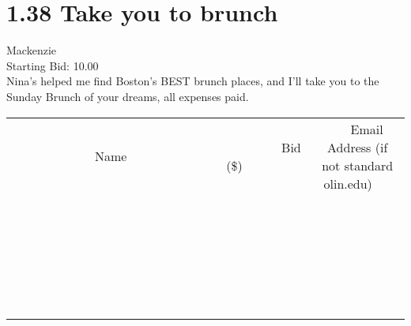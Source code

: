 \documentclass[11pt]{article}
\begin{document}
					\section*{1.38 Take you to brunch}
					Mackenzie \\
					Starting Bid: 10.00 \\
					Nina's helped me find Boston's BEST brunch places, and I'll take you to the Sunday Brunch of your dreams, all expenses paid. \\
					[6ex]
					\begin{tabular}{c c c}
						~~~~~~~~~~~~~Name~~~~~~~~~~~~~ & ~~~~~~~~~Bid (\$)~~~~~~~~~ & ~~~Email Address (if not standard olin.edu)~~~ \\
				
 & & \\
\hline
 & & \\
\hline
 & & \\
\hline
 & & \\
\hline
 & & \\
\hline
 & & \\
\hline
 & & \\
\hline
 & & \\
\hline
 & & \\
\hline
 & & \\
\hline
 & & \\
\hline
 & & \\
\hline
 & & \\
\hline
 & & \\
\hline
 & & \\
\hline
 & & \\
\hline
 & & \\
\hline
 & & \\
\hline
 & & \\
\hline
 & & \\
\hline
 & & \\
\hline
 & & \\
\hline
 & & \\
\hline
 & & \\
\hline
 & & \\
\hline
 & & \\
\hline
					\end{tabular}
					\clearpage
				
\end{document}
